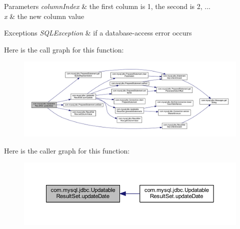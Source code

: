 \begin{DoxyParams}{Parameters}
{\em column\+Index} & the first column is 1, the second is 2, ... \\
\hline
{\em x} & the new column value\\
\hline
\end{DoxyParams}

\begin{DoxyExceptions}{Exceptions}
{\em S\+Q\+L\+Exception} & if a database-\/access error occurs \\
\hline
\end{DoxyExceptions}
Here is the call graph for this function\+:
\nopagebreak
\begin{figure}[H]
\begin{center}
\leavevmode
\includegraphics[width=350pt]{classcom_1_1mysql_1_1jdbc_1_1_updatable_result_set_aafe2454bd0a1a422df6e0165f4828e87_cgraph}
\end{center}
\end{figure}
Here is the caller graph for this function\+:
\nopagebreak
\begin{figure}[H]
\begin{center}
\leavevmode
\includegraphics[width=350pt]{classcom_1_1mysql_1_1jdbc_1_1_updatable_result_set_aafe2454bd0a1a422df6e0165f4828e87_icgraph}
\end{center}
\end{figure}
\mbox{\label{classcom_1_1mysql_1_1jdbc_1_1_updatable_result_set_a1616cc440d8f6ef722aad7914a381747}} 
